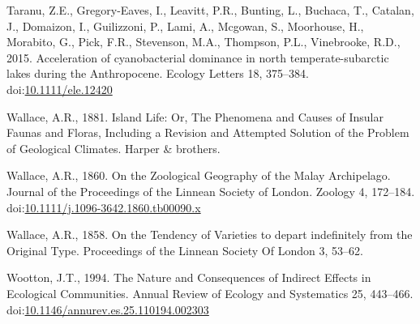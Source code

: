 \hypertarget{ref-Taranu2015}{}
Taranu, Z.E., Gregory-Eaves, I., Leavitt, P.R., Bunting, L., Buchaca,
T., Catalan, J., Domaizon, I., Guilizzoni, P., Lami, A., Mcgowan, S.,
Moorhouse, H., Morabito, G., Pick, F.R., Stevenson, M.A., Thompson,
P.L., Vinebrooke, R.D., 2015. Acceleration of cyanobacterial dominance
in north temperate-subarctic lakes during the Anthropocene. Ecology
Letters 18, 375--384.
doi:\href{https://doi.org/10.1111/ele.12420}{10.1111/ele.12420}

\hypertarget{ref-wallace1881island}{}
Wallace, A.R., 1881. Island Life: Or, The Phenomena and Causes of
Insular Faunas and Floras, Including a Revision and Attempted Solution
of the Problem of Geological Climates. Harper \& brothers.

\hypertarget{ref-Wallace1860}{}
Wallace, A.R., 1860. On the Zoological Geography of the Malay
Archipelago. Journal of the Proceedings of the Linnean Society of
London. Zoology 4, 172--184.
doi:\href{https://doi.org/10.1111/j.1096-3642.1860.tb00090.x}{10.1111/j.1096-3642.1860.tb00090.x}

\hypertarget{ref-Wallace1858}{}
Wallace, A.R., 1858. On the Tendency of Varieties to depart indefinitely
from the Original Type. Proceedings of the Linnean Society Of London 3,
53--62.

\hypertarget{ref-Wootton1994a}{}
Wootton, J.T., 1994. The Nature and Consequences of Indirect Effects in
Ecological Communities. Annual Review of Ecology and Systematics 25,
443--466.
doi:\href{https://doi.org/10.1146/annurev.es.25.110194.002303}{10.1146/annurev.es.25.110194.002303}
